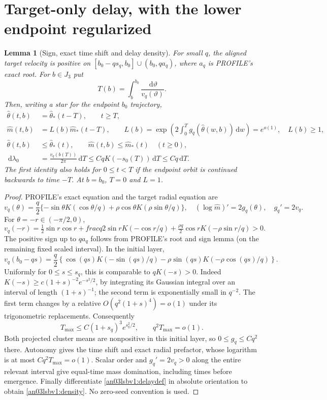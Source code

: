 \documentclass[11pt]{article}
\newtheorem{lemma}[theorem]{Lemma}
\theoremstyle{remark}\newtheorem{remark}[theorem]{Remark}
\newcommand{\dd}{\,\mathrm d}
\begin{document}
\section{Target-only delay, with the lower endpoint regularized}
\begin{lemma}[Sign, exact time shift and delay density]
\label{an03lsbv1:delay}
For small $q$, the aligned target velocity is positive on
$[b_0-qs_q,b_0]\cup(b_0,qa_q)$, where $a_q$ is PROFILE's exact root.
For $b\in J_3$ put
\begin{equation}
 T(b)=\int_b^{b_0}\frac{\dd\vartheta}{v_q(\vartheta)}.
 \label{an03lsbv1:delaydef}
\end{equation}
Then, writing a star for the endpoint $b_0$ trajectory,
\begin{align}
 \widehat\theta(t,b)&=\widehat\theta_*(t-T),\qquad t\ge T,\nonumber\\
 \widehat m(t,b)&=L(b)\widehat m_*(t-T),\qquad
 L(b)=\exp\left(2\int_0^T g_q(\widehat\theta(w,b))\dd w\right)
       =e^{o(1)},\quad L(b)\ge1,\nonumber\\
 \widehat\theta(t,b)&\le\widehat\theta_*(t),\qquad
 \widehat m(t,b)\le\widehat m_*(t)\quad(t\ge0),
 \label{an03lsbv1:shift}\\
 \dd\lambda_0&=\frac{v_q(b(T))}{2\pi}\dd T
 \le CqK(-s_0(T))\dd T\le Cq\dd T.
 \label{an03lsbv1:density}
\end{align}
The first identity also holds for $0\le t<T$ if the endpoint orbit
is continued backwards to time $-T$. At $b=b_0$, $T=0$ and $L=1$.
\end{lemma}
\begin{proof}
PROFILE's exact equation and the target radial equation are
\[
 v_q(\theta)=\frac q2\{-\sin\theta K(\cos\theta/q)
             +\rho\cos\theta K(\rho\sin\theta/q)\},\quad
 (\log\widehat m)'=2g_q(\theta),\quad g_q'=2v_q.
\]
For $\theta=-r\in(-\pi/2,0)$,
\[
 v_q(-r)=\tfrac12\sin r\cos r+	frac q2\sin r K(-\cos r/q)
              +\tfrac{\rho q}2\cos r K(-\rho\sin r/q)>0.
\]
The positive sign up to $qa_q$ follows from PROFILE's root and sign
lemma (on the remaining fixed scaled interval). In the initial layer,
\[
 v_q(b_0-qs)=\frac q2\left\{\cos(qs)K(-\sin(qs)/q)
                 -\rho\sin(qs)K(-\rho\cos(qs)/q)\right\}.
\]
Uniformly for $0\le s\le s_q$, this is comparable to $qK(-s)>0$.
Indeed $K(-s)\ge c(1+s)^{-2}e^{-s^2/2}$, by integrating its
Gaussian integral over an interval of length $(1+s)^{-1}$; the second
term is exponentially small in $q^{-2}$. The first term changes by a
relative $O(q^2(1+s)^4)=o(1)$ under its trigonometric replacements.
Consequently
\[
 T_{\max}\le C(1+s_q)^3e^{s_q^2/2},\qquad q^2T_{\max}=o(1).
\]
Both projected cluster means are nonpositive in this initial layer,
so $0\le g_q\le Cq^2$ there. Autonomy gives the time shift and exact
radial prefactor, whose logarithm is at most $Cq^2T_{\max}=o(1)$.
Scalar order and $g_q'=2v_q>0$ along the entire relevant interval
give equal-time mass domination, including times before emergence.
Finally differentiate \eqref{an03lsbv1:delaydef} in absolute orientation
to obtain \eqref{an03lsbv1:density}. No zero-seed convention is used.
\end{proof}
\end{document}
